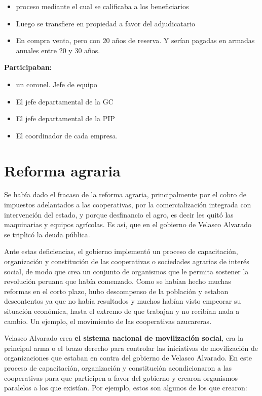 \documentclass[
  letterpaper,
  DIV=11,
  numbers=noendperiod]{scrartcl}
\providecommand{\tightlist}{%
  \setlength{\itemsep}{0pt}\setlength{\parskip}{0pt}}\usepackage{longtable,booktabs,array}
\begin{document}
\begin{itemize}
\tightlist
\item
  proceso mediante el cual se calificaba a los beneficiarios
\item
  Luego se transfiere en propiedad a favor del adjudicatario
\item
  En compra venta, pero con 20 años de reserva. Y serían pagadas en
  armadas anuales entre 20 y 30 años.
\end{itemize}

\textbf{Participaban:}

\begin{itemize}
\tightlist
\item
  un coronel. Jefe de equipo
\item
  El jefe departamental de la GC
\item
  El jefe departamental de la PIP
\item
  El coordinador de cada empresa.
\end{itemize}

\hypertarget{reforma-agraria}{%
\section{Reforma agraria}\label{reforma-agraria}}

Se había dado el fracaso de la reforma agraria, principalmente por el
cobro de impuestos adelantados a las cooperativas, por la
comercialización integrada con intervención del estado, y porque
desfinancio el agro, es decir les quitó las maquinarias y equipos
agrícolas. Es así, que en el gobierno de Velasco Alvarado se triplicó la
deuda pública.

Ante estas deficiencias, el gobierno implementó un proceso de
capacitación, organización y constitución de las cooperativas o
sociedades agrarias de interés social, de modo que crea un conjunto de
organismos que le permita sostener la revolución peruana que había
comenzado. Como se habían hecho muchas reformas en el corto plazo, hubo
descompenso de la población y estaban descontentos ya que no había
resultados y muchos habían visto empeorar su situación económica, hasta
el extremo de que trabajan y no recibían nada a cambio. Un ejemplo, el
movimiento de las cooperativas azucareras.

Velasco Alvarado crea \textbf{el sistema nacional de movilización
social}, era la principal arma o el brazo derecho para controlar las
iniciativas de movilización de organizaciones que estaban en contra del
gobierno de Velasco Alvarado. En este proceso de capacitación,
organización y constitución acondicionaron a las cooperativas para que
participen a favor del gobierno y crearon organismos paralelos a los que
existían. Por ejemplo, estos son algunos de los que crearon:
\end{document}
